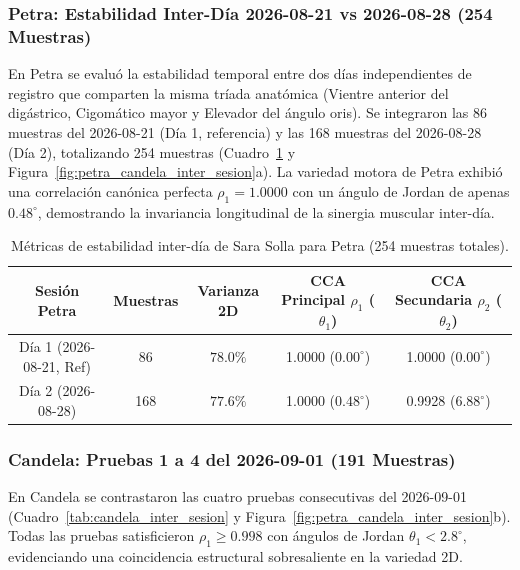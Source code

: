\documentclass[11pt,a4paper,openany]{book}
\theoremstyle{definition}
\begin{document}
\subsubsection{Petra: Estabilidad Inter-Día 2026-08-21 vs 2026-08-28 (254 Muestras)}
En Petra se evaluó la estabilidad temporal entre dos días independientes de registro que comparten la misma tríada anatómica (Vientre anterior del digástrico, Cigomático mayor y Elevador del ángulo oris). Se integraron las 86 muestras del 2026-08-21 (Día 1, referencia) y las 168 muestras del 2026-08-28 (Día 2), totalizando 254 muestras (Cuadro~\ref{tab:petra_inter_sesion} y Figura~\ref{fig:petra_candela_inter_sesion}a). La variedad motora de Petra exhibió una correlación canónica perfecta $\rho_1 = 1.0000$ con un ángulo de Jordan de apenas $0.48^\circ$, demostrando la invariancia longitudinal de la sinergia muscular inter-día.

\begin{table}[H]
\centering
\small
\begin{tabular}{ccccc}
\toprule
\textbf{Sesión Petra} & \textbf{Muestras} & \textbf{Varianza 2D} & \textbf{CCA Principal $\rho_1$ ($\theta_1$)} & \textbf{CCA Secundaria $\rho_2$ ($\theta_2$)} \\
\midrule
Día 1 (2026-08-21, Ref) & 86 & $78.0\%$ & 1.0000 ($0.00^\circ$) & 1.0000 ($0.00^\circ$) \\
Día 2 (2026-08-28)      & 168 & $77.6\%$ & 1.0000 ($0.48^\circ$) & 0.9928 ($6.88^\circ$) \\
\bottomrule
\end{tabular}
\caption{Métricas de estabilidad inter-día de Sara Solla para Petra (254 muestras totales).}
\label{tab:petra_inter_sesion}
\end{table}

\subsubsection{Candela: Pruebas 1 a 4 del 2026-09-01 (191 Muestras)}
En Candela se contrastaron las cuatro pruebas consecutivas del 2026-09-01 (Cuadro~\ref{tab:candela_inter_sesion} y Figura~\ref{fig:petra_candela_inter_sesion}b). Todas las pruebas satisficieron $\rho_1 \ge 0.998$ con ángulos de Jordan $\theta_1 < 2.8^\circ$, evidenciando una coincidencia estructural sobresaliente en la variedad 2D.
\end{document}
